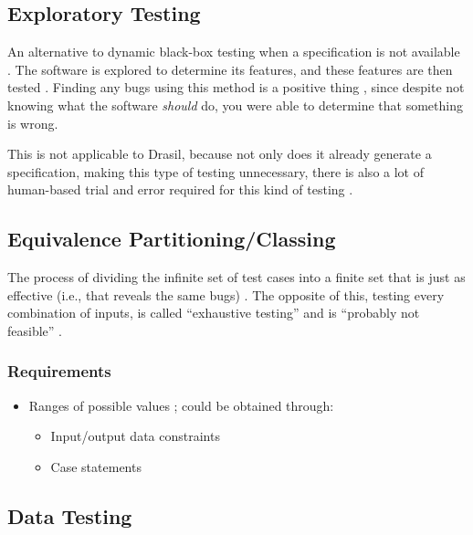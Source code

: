 \subsection[Exploratory Testing]{Exploratory Testing \citep[p.~65]{Patton2006}}

An alternative to dynamic black-box testing when a specification is not
available \citep[p.~65]{Patton2006}. The software is explored to
determine its features, and these features are then tested
\citep[p.~65]{Patton2006}. Finding any bugs using this method is a
positive thing \citep[p.~65]{Patton2006}, since despite not knowing
what the software \emph{should} do, you were able to determine that something
is wrong.

This is not applicable to Drasil, because not only does it already generate a
specification, making this type of testing unnecessary, there is also a lot of
human-based trial and error required for this kind of testing
\citep{june_11_meeting}.

\subsection[Equivalence Partitioning/Classing]{Equivalence Partitioning/Classing
      \citep[pp.~67-69]{Patton2006}}

The process of dividing the infinite set of test cases into a finite set that is
just as effective (i.e., that reveals the same bugs) \citep[p.~67]{Patton2006}.
The opposite of this, testing every combination of inputs, is called
``exhaustive testing'' and is ``probably not feasible'' \exhInfCite{}.

\subsubsection{Requirements}
\begin{itemize}
      \item Ranges of possible values \citep[p.~67]{Patton2006};
            could be obtained through:
            \begin{itemize}
                  \item Input/output data constraints
                  \item Case statements
            \end{itemize}
\end{itemize}

\subsection[Data Testing]{Data Testing \citep[pp.~70-79]{Patton2006}}

